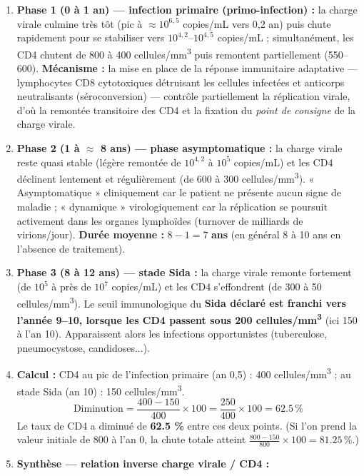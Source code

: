 \documentclass[11pt]{article}
\begin{document}
\begin{corrige}
\begin{enumerate}
    \item \textbf{Phase 1 (0 à 1 an) — infection primaire (primo-infection) :} la charge virale culmine très tôt (pic à $\approx 10^{6,5}$ copies/mL vers 0,2 an) puis chute rapidement pour se stabiliser vers $10^{4,2}$--$10^{4,5}$ copies/mL ; simultanément, les CD4 chutent de 800 à 400 cellules/mm\textsuperscript{3} puis remontent partiellement (550--600). \textbf{Mécanisme :} la mise en place de la réponse immunitaire adaptative — lymphocytes CD8 cytotoxiques détruisant les cellules infectées et anticorps neutralisants (séroconversion) — contrôle partiellement la réplication virale, d'où la remontée transitoire des CD4 et la fixation du \emph{point de consigne} de la charge virale.
    \item \textbf{Phase 2 (1 à $\approx$ 8 ans) — phase asymptomatique :} la charge virale reste quasi stable (légère remontée de $10^{4,2}$ à $10^{5}$ copies/mL) et les CD4 déclinent lentement et régulièrement (de 600 à 300 cellules/mm\textsuperscript{3}). « Asymptomatique » cliniquement car le patient ne présente aucun signe de maladie ; « dynamique » virologiquement car la réplication se poursuit activement dans les organes lymphoïdes (turnover de milliards de virions/jour). \textbf{Durée moyenne :} $8 - 1 = 7$ \textbf{ans} (en général 8 à 10 ans en l'absence de traitement).
    \item \textbf{Phase 3 (8 à 12 ans) — stade Sida :} la charge virale remonte fortement (de $10^{5}$ à près de $10^{7}$ copies/mL) et les CD4 s'effondrent (de 300 à 50 cellules/mm\textsuperscript{3}). Le seuil immunologique du \textbf{Sida déclaré est franchi vers l'année 9--10, lorsque les CD4 passent sous 200 cellules/mm\textsuperscript{3}} (ici 150 à l'an 10). Apparaissent alors les infections opportunistes (tuberculose, pneumocystose, candidoses...).
    \item \textbf{Calcul :} CD4 au pic de l'infection primaire (an 0,5) : 400 cellules/mm\textsuperscript{3} ; au stade Sida (an 10) : 150 cellules/mm\textsuperscript{3}.
    \[ \text{Diminution} = \frac{400 - 150}{400} \times 100 = \frac{250}{400} \times 100 = \num{62,5}\,\% \]
    Le taux de CD4 a diminué de \textbf{\num{62,5} \%} entre ces deux points. (Si l'on prend la valeur initiale de 800 à l'an 0, la chute totale atteint $\frac{800-150}{800}\times100 = \num{81,25}\,\%$.)
    \item \textbf{Synthèse — relation inverse charge virale / CD4 :}

\end{enumerate}
\end{corrige}
\end{document}
